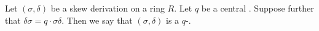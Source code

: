 \documentclass[12pt]{article}
\begin{document}
Let $(\sigma, \delta)$ be a skew derivation on a ring $R$.
Let $q$ be a central .
Suppose further that $\delta\sigma = q \cdot \sigma\delta$.
Then we say that $(\sigma, \delta)$ 
is a $q$-.
\end{document}
